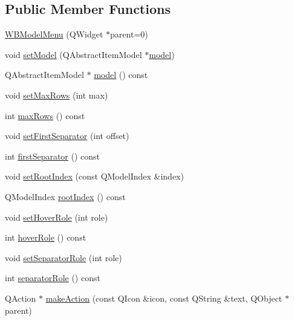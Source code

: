 \subsection*{Public Member Functions}
\begin{DoxyCompactItemize}
\item 
\hyperlink{class_w_b_model_menu_aac39319b5cc4bc1b29828af0f72b512f}{W\-B\-Model\-Menu} (Q\-Widget $\ast$parent=0)
\item 
void \hyperlink{class_w_b_model_menu_ae25bb6bd67167246c9768b28c60f721f}{set\-Model} (Q\-Abstract\-Item\-Model $\ast$\hyperlink{class_w_b_model_menu_ae18fd53c1993bff66dc1b3db0cfd45cd}{model})
\item 
Q\-Abstract\-Item\-Model $\ast$ \hyperlink{class_w_b_model_menu_ae18fd53c1993bff66dc1b3db0cfd45cd}{model} () const 
\item 
void \hyperlink{class_w_b_model_menu_a230a8056c6e3e7412e9490890dccd75e}{set\-Max\-Rows} (int max)
\item 
int \hyperlink{class_w_b_model_menu_a0c2631ecd0587f3875671f3a324d1f51}{max\-Rows} () const 
\item 
void \hyperlink{class_w_b_model_menu_ab41ef3ac8c800cc4d62fcb66695cc5aa}{set\-First\-Separator} (int offset)
\item 
int \hyperlink{class_w_b_model_menu_ad6ac59c5f7e1e5c52574dad3d3e02085}{first\-Separator} () const 
\item 
void \hyperlink{class_w_b_model_menu_a506ecdcd36e1993b4a9de9394ee708b6}{set\-Root\-Index} (const Q\-Model\-Index \&index)
\item 
Q\-Model\-Index \hyperlink{class_w_b_model_menu_aaabfcf2232589eee6351a99f3a9d0b2b}{root\-Index} () const 
\item 
void \hyperlink{class_w_b_model_menu_a568a6ea3c568613fd07c54568ddd102d}{set\-Hover\-Role} (int role)
\item 
int \hyperlink{class_w_b_model_menu_af276d2679024fb35f0aae9834c74fdf8}{hover\-Role} () const 
\item 
void \hyperlink{class_w_b_model_menu_abf82fad1d46cad36ff851ccfd2d6e85c}{set\-Separator\-Role} (int role)
\item 
int \hyperlink{class_w_b_model_menu_a8d3d3100eb58e0d31c19941702602695}{separator\-Role} () const 
\item 
Q\-Action $\ast$ \hyperlink{class_w_b_model_menu_ab07a0d5864e0c88ada596bf225a76b64}{make\-Action} (const Q\-Icon \&icon, const Q\-String \&text, Q\-Object $\ast$parent)
\end{DoxyCompactItemize}
